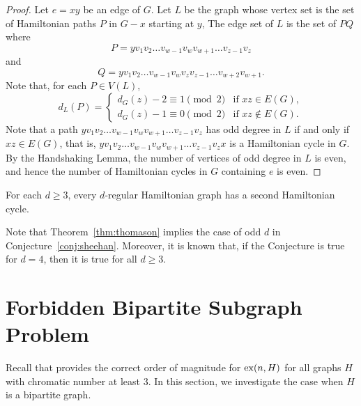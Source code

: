\begin{proof}
    Let \(e = xy\) be an edge of \(G\).
    Let \(L\) be the graph whose vertex set is the set of
    Hamiltonian paths \(P\) in \(G - x\) starting at \(y\),
    The edge set of \(L\) is the set of \(PQ\) where
    \begin{equation}
        P = y v_1 v_2 \ldots v_{w-1} v_w v_{w+1} \ldots v_{z-1} v_z
    \end{equation}
    and 
    \begin{equation}
        Q = y v_1 v_2 \ldots v_{w-1} v_w v_z v_{z-1} \ldots v_{w+2} v_{w+1}.
    \end{equation}
    Note that, for each \(P \in V(L)\),
    \begin{equation}
        d_L(P) =
        \begin{cases}
            d_G(z) - 2 \equiv 1 \pmod{2} & \text{if } xz \in E(G), \\
            d_G(z) - 1 \equiv 0 \pmod{2} & \text{if } xz \not\in E(G).
        \end{cases}
    \end{equation}
    Note that a path \(y v_1 v_2 \ldots v_{w-1} v_w v_{w+1} \ldots v_{z-1} v_z\) 
    has odd degree in \(L\) if and only if \(xz \in E(G)\), that is, \(y v_1 v_2 \ldots v_{w-1} v_w v_{w+1} \ldots v_{z-1} v_z x\) is a Hamiltonian cycle in \(G\).
    By the Handshaking Lemma,
    the number of vertices of odd degree in \(L\) is even,
    and hence the number of Hamiltonian cycles in \(G\) containing \(e\) is even.
\end{proof}

\begin{conjecture}[Sheehan] \label{conj:sheehan}
    For each \(d \geq 3\), every \(d\)-regular Hamiltonian graph has a second Hamiltonian cycle.
\end{conjecture}

Note that Theorem~\ref{thm:thomason} implies the case of odd \(d\) in Conjecture~\ref{conj:sheehan}.
Moreover, it is known that, if the Conjecture is true for \(d = 4\), then it is true for all \(d \geq 3\).

\section{Forbidden Bipartite Subgraph Problem}

Recall that  provides the correct order of magnitude for \(\operatorname{ex}(n, H)\) for all graphs \(H\) with chromatic number at least \(3\).
In this section, we investigate the case when \(H\) is a bipartite graph.

